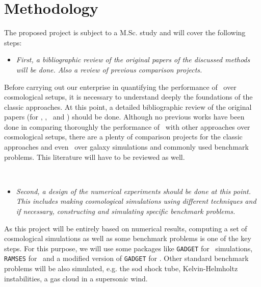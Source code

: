 \documentclass[a4,useAMS,usenatbib,usegraphicx,12pt]{article}
\begin{document}
\section{Methodology}
The proposed project is subject to a M.Sc. study and will cover the following 
steps:


\begin{itemize}
\item[\checkmark] \textit{First, a bibliographic review of the original papers 
of the discussed methods will be done. Also a review of previous comparison 
projects.}
\end{itemize}


Before carrying out our enterprise in quantifying the performance of \VPH\ over
cosmological setups, it is necessary to understand deeply the foundations of 
the classic approaches. At this point, a detailed bibliographic review of the 
original papers (for \SPH, \AMR, \VPH\ and \AREPO) should be done. Although no 
previous works have been done in comparing thoroughly the performance of \VPH\
with other approaches over cosmological setups, there are a plenty of comparison
projects for the classic approaches and even \AREPO\ over galaxy simulations and 
commonly used benchmark problems. This literature will have to be reviewed as 
well.

\

\begin{itemize}
\item[\checkmark] \textit{Second, a design of the numerical experiments should 
be done at this point. This includes making cosmological simulations using 
different techniques and if necessary, constructing and simulating specific 
benchmark problems.}
\end{itemize}


As this project will be entirely based on numerical results, computing a set of
cosmological simulations as well as some benchmark problems is one of the key 
steps. For this purpose, we will use some packages like \texttt{GADGET} 
\citet{Springel05} for \SPH\ simulations, \texttt{RAMSES} \citet{Teyssier02} 
for \AMR\ and a modified version of \texttt{GADGET} for \VPH. Other standard 
benchmark problems will be also simulated, e.g. the sod shock tube, 
Kelvin-Helmholtz instabilities, a gas cloud in a supersonic wind.

\
\end{document}
